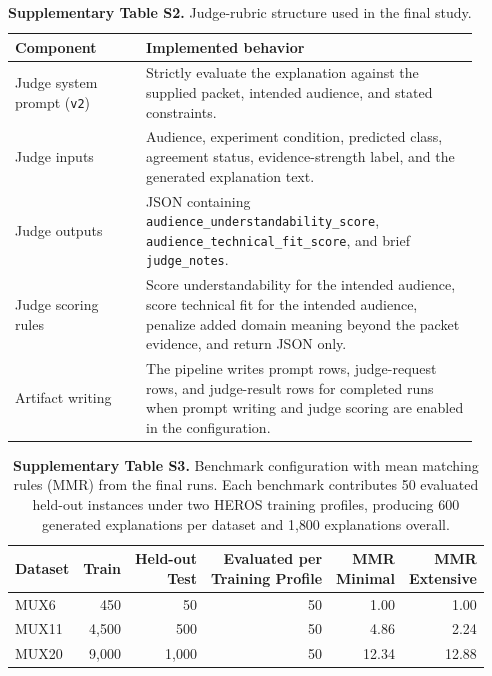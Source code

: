 \documentclass[11pt]{article}
\begin{document}
\begin{table}[H]
\caption*{\textbf{Supplementary Table S2.} Judge-rubric structure used in the final study.}
\label{tab:judge-docs-supp}
\centering
\small
\setlength{\tabcolsep}{4pt}
\renewcommand{\arraystretch}{1.05}
\begin{tabular}{L{0.26\linewidth}L{0.66\linewidth}}
\toprule
\textbf{Component} & \textbf{Implemented behavior} \\
\midrule
Judge system prompt (\texttt{v2}) & Strictly evaluate the explanation against the supplied packet, intended audience, and stated constraints. \\
Judge inputs & Audience, experiment condition, predicted class, agreement status, evidence-strength label, and the generated explanation text. \\
Judge outputs & JSON containing \texttt{audience\_understandability\_score}, \texttt{audience\_technical\_fit\_score}, and brief \texttt{judge\_notes}. \\
Judge scoring rules & Score understandability for the intended audience, score technical fit for the intended audience, penalize added domain meaning beyond the packet evidence, and return JSON only. \\
Artifact writing & The pipeline writes prompt rows, judge-request rows, and judge-result rows for completed runs when prompt writing and judge scoring are enabled in the configuration. \\
\bottomrule
\end{tabular}
\end{table}

\begin{table}[H]
\caption*{\textbf{Supplementary Table S3.} Benchmark configuration with mean matching rules (MMR) from the final runs. Each benchmark contributes 50 evaluated held-out instances under two HEROS training profiles, producing 600 generated explanations per dataset and 1{,}800 explanations overall.}
\label{tab:benchmarks-supp}
\centering
\small
\setlength{\tabcolsep}{4pt}
\begin{tabular}{lrrrrr}
\toprule
\textbf{Dataset} & \textbf{Train} & \shortstack{\textbf{Held-out}\\\textbf{Test}} & \shortstack{\textbf{Evaluated per}\\\textbf{Training Profile}} & \shortstack{\textbf{MMR}\\\textbf{Minimal}} & \shortstack{\textbf{MMR}\\\textbf{Extensive}} \\
\midrule
MUX6  & 450  & 50   & 50 & 1.00 & 1.00 \\
MUX11 & 4{,}500 & 500  & 50 & 4.86 & 2.24 \\
MUX20 & 9{,}000 & 1{,}000 & 50 & 12.34 & 12.88 \\
\bottomrule
\end{tabular}
\end{table}
\end{document}
